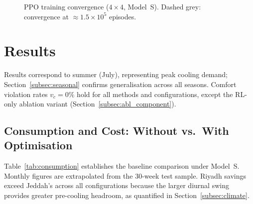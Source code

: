 \documentclass[3p,number]{elsarticle}
\let\oldsection\section
\renewcommand{\section}{\FloatBarrier\oldsection}
\let\oldsubsection\subsection
\renewcommand{\subsection}{\FloatBarrier\oldsubsection}
\begin{document}
\begin{figure}[!t]
\centering
{}
\caption{PPO training convergence ($4\!\times\!4$, Model~S).
Dashed grey: convergence at ${\approx}1.5\times10^5$ episodes.}
\label{fig:convergence}
\end{figure}
 
\section{Results}
\label{sec:results}
 
Results correspond to summer (July), representing peak cooling demand; Section~\ref{subsec:seasonal} confirms generalisation across all seasons.
Comfort violation rates $v_c=0\%$ hold for all methods and configurations, except the RL-only ablation variant (Section~\ref{subsec:abl_component}).
 
\subsection{Consumption and Cost: Without vs.\ With Optimisation}
\label{subsec:consumption}
 
Table~\ref{tab:consumption} establishes the baseline comparison under Model~S.
Monthly figures are extrapolated from the 30-week test sample.
Riyadh savings exceed Jeddah's across all configurations because the larger diurnal swing provides greater pre-cooling headroom, as quantified in Section~\ref{subsec:climate}.
 
\end{document}
